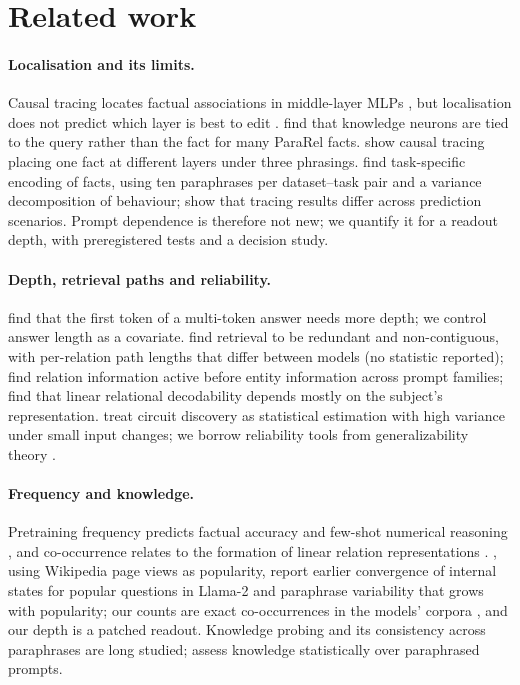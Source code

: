 \documentclass[11pt]{article}
\begin{document}
\section{Related work}
\label{sec:related}
\paragraph{Localisation and its limits.}
Causal tracing locates factual associations in middle-layer MLPs \citep{meng2022rome}, but localisation does not predict which layer is best to edit \citep{hase2023localization}.
\citet{chen2024knowledge} find that knowledge neurons are tied to the query rather than the fact for many ParaRel facts.
\citet{benz2026knowledgedebugger} show causal tracing placing one fact at different layers under three phrasings.
\citet{elhelo2026task} find task-specific encoding of facts, using ten paraphrases per dataset--task pair and a variance decomposition of behaviour; \citet{saynova2024scenarios} show that tracing results differ across prediction scenarios.
Prompt dependence is therefore not new; we quantify it for a readout depth, with preregistered tests and a decision study.
\paragraph{Depth, retrieval paths and reliability.}
\citet{gupta2025depth} find that the first token of a multi-token answer needs more depth; we control answer length as a covariate.
\citet{hochman2026factual} find retrieval to be redundant and non-contiguous, with per-relation path lengths that differ between models (no statistic reported); \citet{agarwal2026relation} find relation information active before entity information across prompt families; \citet{rohweder2026predicting} find that linear relational decodability depends mostly on the subject's representation.
\citet{meloux2025circuits} treat circuit discovery as statistical estimation with high variance under small input changes; we borrow reliability tools from generalizability theory \citep{brennan2001gtheory}.
\paragraph{Frequency and knowledge.}
Pretraining frequency predicts factual accuracy \citep{kandpal2023longtail,mallen2023popqa} and few-shot numerical reasoning \citep{razeghi2022frequencies}, and co-occurrence relates to the formation of linear relation representations \citep{merullo2025linear,hernandez2024linearity}.
\citet{bajpai2024popular}, using Wikipedia page views as popularity, report earlier convergence of internal states for popular questions in Llama-2 and paraphrase variability that grows with popularity; our counts are exact co-occurrences in the models' corpora \citep{liu2024infinigram}, and our depth is a patched readout.
Knowledge probing \citep{petroni2019lama} and its consistency across paraphrases \citep{elazar2021pararel} are long studied; \citet{dong2023karr} assess knowledge statistically over paraphrased prompts.
\end{document}
